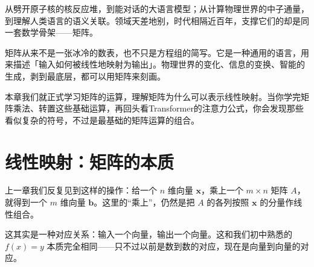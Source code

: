 \documentclass[a4paper,12pt,twoside,openany,fontset=none]{ctexbook}
\numberwithin{equation}{chapter}
\begin{document}
从劈开原子核的核反应堆，到能对话的大语言模型；从计算物理世界的中子通量，到理解人类语言的语义关联。领域天差地别，时代相隔近百年，支撑它们的却是同一套数学骨架——矩阵。

矩阵从来不是一张冰冷的数表，也不只是方程组的简写。它是一种通用的语言，用来描述「输入如何被线性地映射为输出」。物理世界的变化、信息的变换、智能的生成，剥到最底层，都可以用矩阵来刻画。

本章我们就正式学习矩阵的运算，理解矩阵为什么可以表示线性映射。当你学完矩阵乘法、转置这些基础运算，再回头看Transformer的注意力公式，你会发现那些看似复杂的符号，不过是最基础的矩阵运算的组合。



\clearpage
\setcounter{figure}{0}
\renewcommand{\thefigure}{\thechapter.\arabic{figure}}
\renewcommand{\theHfigure}{\thechapter.\arabic{figure}}
\section{线性映射：矩阵的本质}
\label{sec:three-matrix-representation}
\begingroup
\setlength{\parskip}{4pt}
\newcommand{\ThreeCol}[1]{\left(\begin{array}{r}#1\end{array}\right)}
\newcommand{\ThreeMatrix}[2]{\left[\begin{array}{#1}#2\end{array}\right]}

上一章我们反复见到这样的操作：给一个 $n$ 维向量 $\boldsymbol{x}$，乘上一个 $m\times n$ 矩阵 $A$，就得到一个 $m$ 维向量 $\boldsymbol{b}$。这里的“乘上”，仍然是把 $A$ 的各列按照 $\boldsymbol{x}$ 的分量作线性组合。

这其实是一种对应关系：输入一个向量，输出一个向量。这和我们初中熟悉的 $f(x)=y$ 本质完全相同——只不过以前是数到数的对应，现在是向量到向量的对应。
\end{document}
